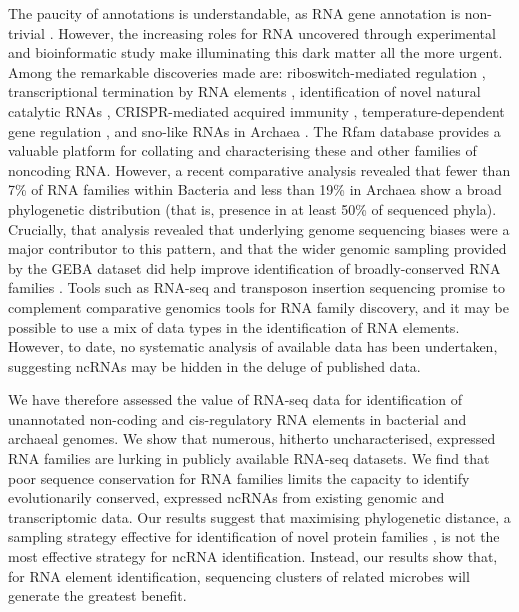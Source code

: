 \documentclass[10pt]{article}
\begin{document}
The paucity of annotations is understandable, as RNA gene annotation
is non-trivial \cite{Freyhult:2007,Nawrocki:2009}. However, the
increasing roles for RNA uncovered through experimental and
bioinformatic study make illuminating this dark matter all the more
urgent. Among the remarkable discoveries made are: riboswitch-mediated
regulation \cite{Barrick:2007}, transcriptional termination by RNA
elements \cite{Gardner:2011,Chen:2013,Cambray:2013}, identification of
novel natural catalytic RNAs \cite{Roth:2014}, CRISPR-mediated
acquired immunity \cite{Barrangou:2007}, temperature-dependent gene
regulation \cite{Loh:2013}, and sno-like RNAs in Archaea
\cite{Omer:2000,Gardner:2010}. The Rfam database
\cite{Gardner:2011,Burge:2013} provides a valuable platform for
collating and characterising these and other families of noncoding
RNA. However, a recent comparative analysis \cite{Hoeppner:2012}
revealed that fewer than 7\% of RNA families within Bacteria and less
than 19\% in Archaea show a broad phylogenetic distribution (that is,
presence in at least 50\% of sequenced phyla). Crucially, that
analysis revealed that underlying genome sequencing biases were a
major contributor to this pattern, and that the wider genomic sampling
provided by the GEBA dataset did help improve identification of
broadly-conserved RNA families \cite{Hoeppner:2012}. Tools such as
RNA-seq \cite{Croucher:2010} and transposon insertion
sequencing \cite{van_Opijnen:2013,Barquist:2013,Barquist:2013a}
promise to complement comparative genomics tools for RNA family
discovery, and it may be possible to use a mix of data types in the
identification of RNA elements. However, to date, no systematic
analysis of available data has been undertaken, suggesting ncRNAs may
be hidden in the deluge of published data.

We have therefore assessed the value of RNA-seq data for
identification of unannotated non-coding and cis-regulatory RNA
elements in bacterial and archaeal genomes. We show that numerous,
hitherto uncharacterised, expressed RNA families are lurking in
publicly available RNA-seq datasets. We find that poor sequence
conservation for RNA families limits the capacity to identify
evolutionarily conserved, expressed ncRNAs from existing genomic and
transcriptomic data. Our results suggest that maximising phylogenetic
distance, a sampling strategy effective for identification of novel
protein families \cite{Wu:2009,Rinke:2013}, is not the
most effective strategy for ncRNA identification. Instead, our results
show that, for RNA element identification, sequencing clusters of
related microbes will generate the greatest benefit.
\end{document}
